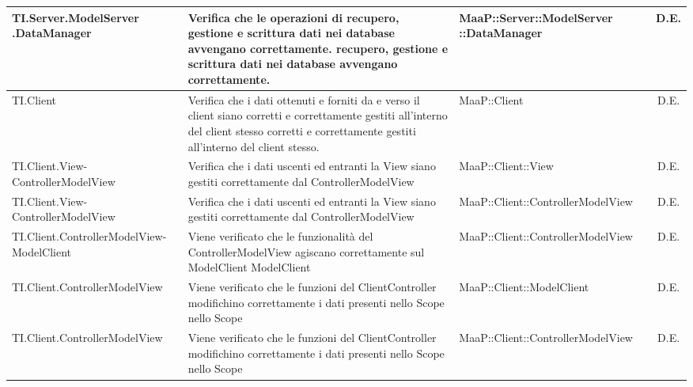 \begin{center}
\begin{longtable}{|p{4.5cm}|p{3cm}|p{5.5cm}|c|}
\midrule
TI.Server.ModelServer .DataManager
& Verifica che le operazioni di recupero, gestione e scrittura dati nei database avvengano correttamente.
recupero, gestione e scrittura
dati nei database avvengano
correttamente.
& MaaP::Server::ModelServer ::DataManager
& D.E.\\


\midrule
TI.Client
& Verifica che i dati ottenuti e forniti da e verso il client siano corretti e correttamente gestiti all'interno del client stesso
corretti e correttamente gestiti
all'interno del client stesso.
& MaaP::Client
& D.E.\\


\midrule
TI.Client.View-ControllerModelView
& Verifica che i dati uscenti ed entranti la View siano gestiti correttamente dal ControllerModelView
& MaaP::Client::View
& D.E.\\


\midrule
TI.Client.View-ControllerModelView
& Verifica che i dati uscenti ed entranti la View siano gestiti correttamente dal ControllerModelView
& MaaP::Client::ControllerModelView
& D.E.\\


\midrule
TI.Client.ControllerModelView-ModelClient
& Viene verificato che le funzionalità del ControllerModelView agiscano correttamente sul ModelClient
ModelClient
& MaaP::Client::ControllerModelView
& D.E.\\


\midrule
TI.Client.ControllerModelView
& Viene verificato che le funzioni del ClientController modifichino correttamente i dati presenti nello Scope
nello Scope
& MaaP::Client::ModelClient
& D.E.\\


\midrule
TI.Client.ControllerModelView
& Viene verificato che le funzioni del ClientController modifichino correttamente i dati presenti nello Scope
nello Scope
& MaaP::Client::ControllerModelView
& D.E.\\


\end{longtable}
\end{center}

